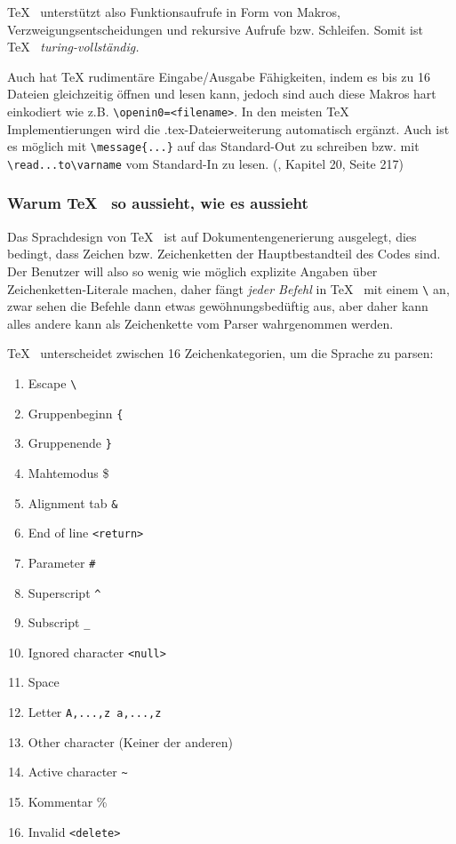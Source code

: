 \TeX~ unterstützt also Funktionsaufrufe in Form von Makros,
Verzweigungsentscheidungen
und rekursive Aufrufe bzw. Schleifen. Somit ist \TeX~ \emph{turing-vollständig.}

Auch hat TeX rudimentäre Eingabe/Ausgabe Fähigkeiten, indem es
bis zu 16 Dateien gleichzeitig öffnen und lesen kann, jedoch sind auch
diese Makros hart einkodiert wie z.B. \lstinline|\openin0=<filename>|.
In den meisten
\TeX~ Implementierungen wird die .tex-Dateierweiterung automatisch
ergänzt.
Auch ist es möglich mit \lstinline|\message{...}| auf das Standard-Out zu schreiben
bzw. mit \lstinline|\read...to\varname| vom Standard-In zu lesen.
(\cite{tex-a}, Kapitel 20, Seite 217)

\subsubsection{Warum \TeX~ so aussieht, wie es aussieht}

Das Sprachdesign von \TeX~ ist auf Dokumentengenerierung ausgelegt, dies
bedingt, dass Zeichen bzw. Zeichenketten der Hauptbestandteil des Codes
sind. Der Benutzer will also so wenig wie möglich explizite Angaben über
Zeichenketten-Literale machen, daher fängt \emph{jeder Befehl} in \TeX~
mit einem \lstinline|\| an, zwar sehen die Befehle dann etwas gewöhnungsbedüftig
aus, aber daher kann alles andere kann als Zeichenkette vom Parser
wahrgenommen werden.

\TeX~ unterscheidet zwischen 16 Zeichenkategorien, um die Sprache zu parsen:

\begin{enumerate}
  \item Escape \lstinline|\|
  \item Gruppenbeginn \lstinline|{|
  \item Gruppenende \lstinline|}|
  \item Mahtemodus \$
  \item Alignment tab \lstinline|&|
  \item End of line \lstinline|<return>|
  \item Parameter \lstinline|#|
  \item Superscript \lstinline|^|
  \item Subscript \lstinline|_|
  \item Ignored character \lstinline|<null>|
  \item Space
  \item Letter \lstinline|A,...,z a,...,z|
  \item Other character (Keiner der anderen)
  \item Active character \lstinline|~|
  \item Kommentar \%
  \item Invalid \lstinline|<delete>|
\end{enumerate}

